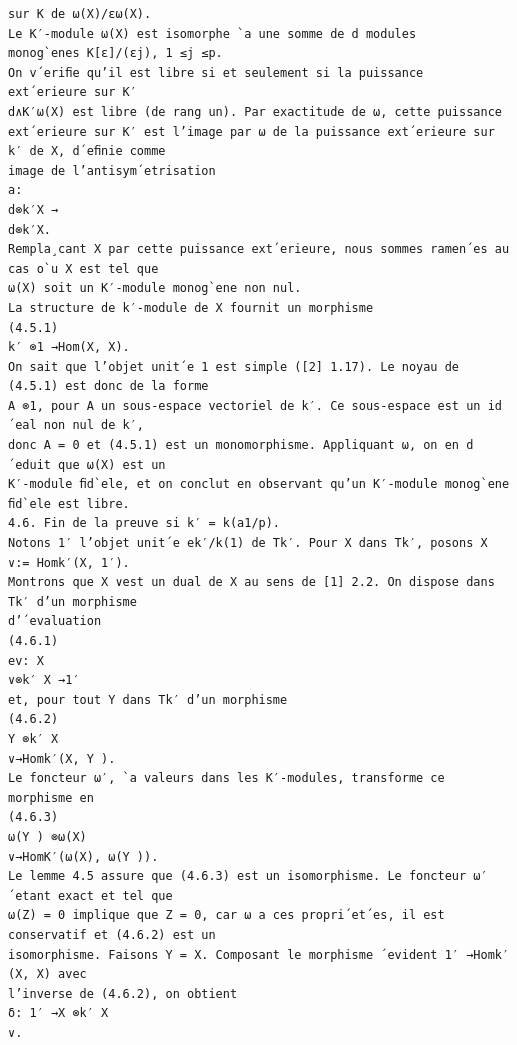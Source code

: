 \documentclass[10pt]{article}
\begin{document}
\begin{verbatim}
sur K de ω(X)/εω(X).
Le K′-module ω(X) est isomorphe `a une somme de d modules
monog`enes K[ε]/(εj), 1 ≤j ≤p.
On v´eriﬁe qu’il est libre si et seulement si la puissance
ext´erieure sur K′
d∧K′ω(X) est libre (de rang un). Par exactitude de ω, cette puissance
ext´erieure sur K′ est l’image par ω de la puissance ext´erieure sur k′ de X, d´eﬁnie comme
image de l’antisym´etrisation
a:
d⊗k′X →
d⊗k′X.
Rempla¸cant X par cette puissance ext´erieure, nous sommes ramen´es au cas o`u X est tel que
ω(X) soit un K′-module monog`ene non nul.
La structure de k′-module de X fournit un morphisme
(4.5.1)
k′ ⊗1 →Hom(X, X).
On sait que l’objet unit´e 1 est simple ([2] 1.17). Le noyau de (4.5.1) est donc de la forme
A ⊗1, pour A un sous-espace vectoriel de k′. Ce sous-espace est un id´eal non nul de k′,
donc A = 0 et (4.5.1) est un monomorphisme. Appliquant ω, on en d´eduit que ω(X) est un
K′-module ﬁd`ele, et on conclut en observant qu’un K′-module monog`ene ﬁd`ele est libre.
4.6. Fin de la preuve si k′ = k(a1/p).
Notons 1′ l’objet unit´e ek′/k(1) de Tk′. Pour X dans Tk′, posons X ∨:= Homk′(X, 1′).
Montrons que X ∨est un dual de X au sens de [1] 2.2. On dispose dans Tk′ d’un morphisme
d’´evaluation
(4.6.1)
ev: X
∨⊗k′ X →1′
et, pour tout Y dans Tk′ d’un morphisme
(4.6.2)
Y ⊗k′ X
∨→Homk′(X, Y ).
Le foncteur ω′, `a valeurs dans les K′-modules, transforme ce morphisme en
(4.6.3)
ω(Y ) ⊗ω(X)
∨→HomK′(ω(X), ω(Y )).
Le lemme 4.5 assure que (4.6.3) est un isomorphisme. Le foncteur ω′ ´etant exact et tel que
ω(Z) = 0 implique que Z = 0, car ω a ces propri´et´es, il est conservatif et (4.6.2) est un
isomorphisme. Faisons Y = X. Composant le morphisme ´evident 1′ →Homk′(X, X) avec
l’inverse de (4.6.2), on obtient
δ: 1′ →X ⊗k′ X
∨.


\end{verbatim}
\end{document}
